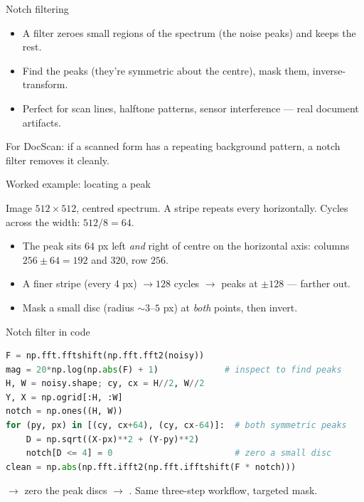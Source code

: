 \documentclass[10pt,aspectratio=169]{beamer}
\begin{document}
\begin{frame}{Notch filtering}
  \begin{itemize}
    \item A  filter zeroes small regions of the spectrum (the noise peaks) and keeps the rest.
    \item Find the peaks (they're symmetric about the centre), mask them, inverse-transform.
    \item Perfect for scan lines, halftone patterns, sensor interference — real document artifacts.
  \end{itemize}
  \begin{goodbox}
    For DocScan: if a scanned form has a repeating background pattern, a notch filter removes it cleanly.
  \end{goodbox}
\end{frame}

\begin{frame}{Worked example: locating a peak}
  \begin{mathbox}
    Image $512\times512$, centred spectrum. A stripe repeats every \term{8 px} horizontally.
    Cycles across the width: $512/8 = 64$.
  \end{mathbox}
  \begin{itemize}
    \item The peak sits $64$ px left \emph{and} right of centre on the horizontal axis:
          columns $256\pm64 = 192$ and $320$, row $256$.
    \item A finer stripe (every 4 px) $\rightarrow 128$ cycles $\rightarrow$ peaks at $\pm128$ — farther out.
    \item Mask a small disc (radius $\sim3$--$5$ px) at \emph{both} points, then invert.
  \end{itemize}
\end{frame}

\begin{frame}[fragile]{Notch filter in code}
\begin{lstlisting}[language=Python]
F = np.fft.fftshift(np.fft.fft2(noisy))
mag = 20*np.log(np.abs(F) + 1)             # inspect to find peaks
H, W = noisy.shape; cy, cx = H//2, W//2
Y, X = np.ogrid[:H, :W]
notch = np.ones((H, W))
for (py, px) in [(cy, cx+64), (cy, cx-64)]:  # both symmetric peaks
    D = np.sqrt((X-px)**2 + (Y-py)**2)
    notch[D <= 4] = 0                        # zero a small disc
clean = np.abs(np.fft.ifft2(np.fft.ifftshift(F * notch)))
\end{lstlisting}
   $\rightarrow$ zero the peak discs $\rightarrow$ . Same three-step workflow, targeted mask.
\end{frame}
\end{document}
